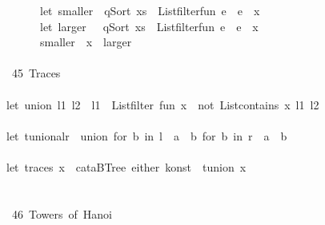 \documentclass[a4paper]{article}
\begin{document}
\begin{tabbing}
\ttfamily ~~~~~~~let~smaller~~qSort~xs~~Listfilterfun~e~~e~~x\\
\ttfamily ~~~~~~~let~larger~~~qSort~xs~~Listfilterfun~e~~e~~x\\
\ttfamily ~~~~~~~smaller~~x~~larger\\
\ttfamily ~~~~~~~~~~~~~~~~~~~~\\
\ttfamily ~~45~Traces~\\
\ttfamily ~\\
\ttfamily ~let~union~l1~l2~~l1~~Listfilter~fun~x~~not~Listcontains~x~l1~l2\\
\ttfamily ~~~~~~~~~~~~~~~~\\
\ttfamily ~let~tunionalr~~union~for~b~in~l~~a~~b~for~b~in~r~~a~~b\\
\ttfamily ~\\
\ttfamily ~let~traces~x~~cataBTree~either~konst~~tunion~x\\
\ttfamily ~\\
\ttfamily ~\\
\ttfamily ~~46~Towers~of~Hanoi~\\

\end{tabbing}
\end{document}
